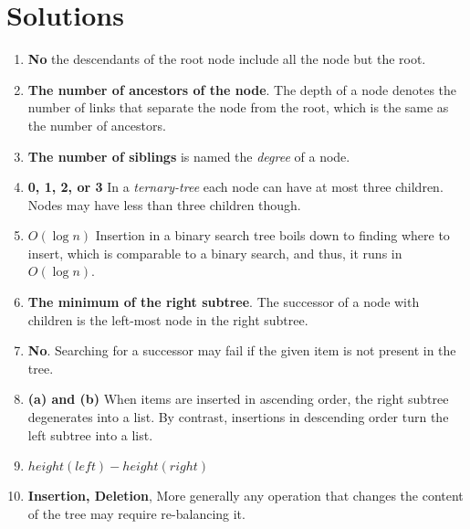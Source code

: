 \documentclass[11pt]{article}
\begin{document}
\section{Solutions}
\label{sec:org57ae384}

\begin{enumerate}
\item \textbf{No} the descendants of the root node include all the node but the root.

\item \textbf{The number of ancestors of the node}. The depth of a node denotes
the number of links that separate the node from the root, which
is the same as the number of ancestors.

\item \textbf{The number of siblings} is named the \emph{degree} of a node.

\item \textbf{0, 1, 2, or 3} In a \emph{ternary-tree} each node can have at most
three children. Nodes may have less than three children though.

\item \textbf{\(O(\log n)\)} Insertion in a binary search tree boils down to
finding where to insert, which is comparable to a binary search,
and thus, it runs in \(O(\log n)\).

\item \textbf{The minimum of the right subtree}. The successor of a node with
children is the left-most node in the right subtree.

\item \textbf{No}. Searching for a successor may fail if the given item is not
present in the tree.

\item \textbf{(a) and (b)} When items are inserted in ascending order, the
right subtree degenerates into a list. By contrast, insertions in
descending order turn the left subtree into a list.

\item \textbf{\(height(left) - height(right)\)}

\item \textbf{Insertion, Deletion}, More generally any operation that changes
the content of the tree may require re-balancing it.
\end{enumerate}
\end{document}
